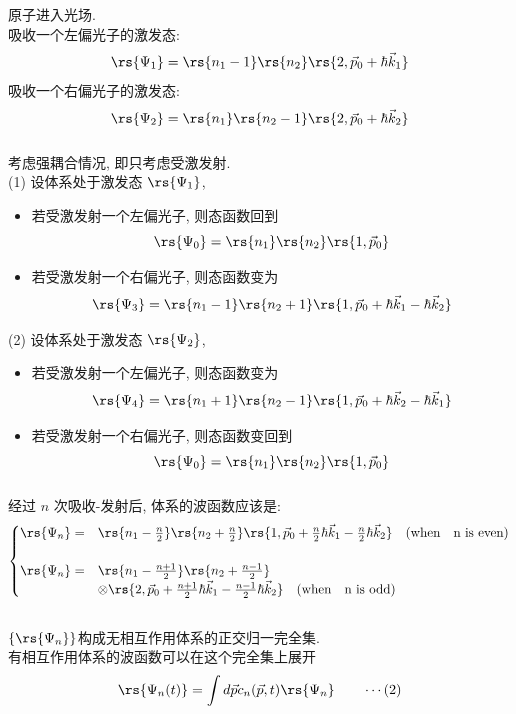     \begin{frame} 
    \frametitle{}
         原子进入光场. \\  
         吸收一个左偏光子的激发态:
         \[ \rs{\Psi_1}= \rs{n_1 -1} \rs{n_2}\rs{2,\vec{p}_0+ \hbar \vec{k}_1}\]
         吸收一个右偏光子的激发态:
         \[ \rs{\Psi_2}= \rs{n_1 } \rs{n_2 -1}\rs{2,\vec{p}_0+ \hbar \vec{k}_2}\]
    \end{frame}

    \begin{frame} 
    \frametitle{}
         考虑强耦合情况, 即只考虑受激发射. \\ 
         (1) 设体系处于激发态 $\rs{\Psi_1}$,  \\ 
         \begin{itemize}
             \item 若受激发射一个左偏光子, 则态函数回到 
             \[\rs{\Psi_0} = \rs{n_1} \rs{n_2}\rs{1,\vec{p}_0}\]
             \item 若受激发射一个右偏光子, 则态函数变为
             \[\rs{\Psi_3}= \rs{n_1 -1} \rs{n_2 +1 }\rs{1,\vec{p}_0+ \hbar \vec{k}_1 - \hbar \vec{k}_2}\]
         \end{itemize}
         (2) 设体系处于激发态 $\rs{\Psi_2}$,  \\ 
         \begin{itemize}
             \item 若受激发射一个左偏光子, 则态函数变为
             \[\rs{\Psi_4}= \rs{n_1 +1} \rs{n_2 -1 }\rs{1,\vec{p}_0+ \hbar \vec{k}_2 - \hbar \vec{k}_1}\]
             \item 若受激发射一个右偏光子, 则态函数变回到
             \[\rs{\Psi_0} = \rs{n_1} \rs{n_2}\rs{1,\vec{p}_0}\]
         \end{itemize}
    \end{frame}

    \begin{frame} 
    \frametitle{}
        经过 $n$ 次吸收-发射后, 体系的波函数应该是:
        \[ \begin{cases}
            \rs{\Psi_n} = &\rs{n_1 - \frac{n}{2}} \rs{n_2 + \frac{n}{2} }\rs{1,\vec{p}_0 + \frac{n}{2} \hbar \vec{k}_1 - \frac{n}{2}\hbar \vec{k}_2} \quad (\text{when ~ n is even}) \\ 
            ~\\ 
            \rs{\Psi_n} = &\rs{n_1 - \frac{n+1}{2}} \rs{n_2 + \frac{n-1}{2} }\\ 
            & \otimes \rs{2,\vec{p}_0 + \frac{n+1}{2} \hbar \vec{k}_1 - \frac{n-1}{2}\hbar \vec{k}_2} \quad (\text{when ~ n is odd}) 
        \end{cases} \]
        ~ \\ 
        $\{\rs{\Psi_n}\}$构成无相互作用体系的正交归一完全集.  \\ 
        有相互作用体系的波函数可以在这个完全集上展开 
        \[ \rs{\Psi_n (t)}  =  \int d \vec{p} c_n(\vec{p},t) \rs{\Psi_n} \qquad \cdots (2)\]
    \end{frame}

